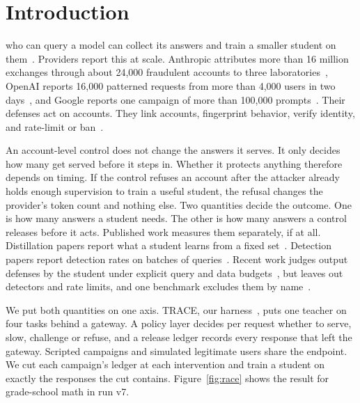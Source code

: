 \documentclass[journal]{IEEEtran}
\begin{document}
\section{Introduction}
 who can query a model can collect its answers and train a smaller student on them~\cite{tramer2016stealing,orekondy2019knockoff,hinton2015distilling,kim2016sequence}. Providers report this at scale. Anthropic attributes more than 16 million exchanges through about 24,000 fraudulent accounts to three laboratories~\cite{anthropic2026detecting}, OpenAI reports 16,000 patterned requests from more than 4,000 users in two days~\cite{openai2026disrupting}, and Google reports one campaign of more than 100,000 prompts~\cite{gtig2026distillation}. Their defenses act on accounts. They link accounts, fingerprint behavior, verify identity, and rate-limit or ban~\cite{anthropic2026detecting,anthropic2026defenses,openai2026disrupting}.

An account-level control does not change the answers it serves. It only decides how many get served before it steps in. Whether it protects anything therefore depends on timing. If the control refuses an account after the attacker already holds enough supervision to train a useful student, the refusal changes the provider's token count and nothing else. Two quantities decide the outcome. One is how many answers a student needs. The other is how many answers a control releases before it acts. Published work measures them separately, if at all. Distillation papers report what a student learns from a fixed set~\cite{muennighoff2025s1,ye2025limo,jiang2026distillguard}. Detection papers report detection rates on batches of queries~\cite{juuti2019prada,liu2026detector,liu2026lifecycle}. Recent work judges output defenses by the student under explicit query and data budgets~\cite{libon2026break,allouah2026game}, but leaves out detectors and rate limits, and one benchmark excludes them by name~\cite{jiang2026distillguard}.

We put both quantities on one axis. TRACE, our harness~\cite{trace2026artifact}, puts one teacher on four tasks behind a gateway. A policy layer decides per request whether to serve, slow, challenge or refuse, and a release ledger records every response that left the gateway. Scripted campaigns and simulated legitimate users share the endpoint. We cut each campaign's ledger at each intervention and train a student on exactly the responses the cut contains. Figure~\ref{fig:race} shows the result for grade-school math in run v7.
\end{document}

